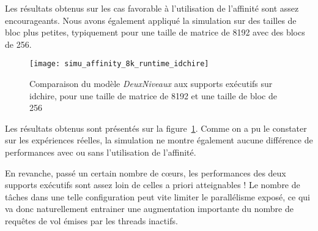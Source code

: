 Les résultats obtenus sur les cas favorable à l'utilisation de l'affinité sont assez encourageants.
Nous avons également appliqué la simulation sur des tailles de bloc plus petites, typiquement pour une taille de matrice de 8192 avec des blocs de 256.

\begin{figure}[h!]
  \centering
  \texttt{[image: simu\_affinity\_8k\_runtime\_idchire]}
  \caption{Comparaison du modèle \emph{DeuxNiveaux} aux supports exécutifs sur idchire, pour une taille de matrice de 8192 et une taille de bloc de 256}\label{fig:simu:affinityavg-8k-vs-runtime:idchire}
\end{figure}






Les résultats obtenus sont présentés sur la figure~\ref{fig:simu:affinityavg-8k-vs-runtime:idchire}.
Comme on a pu le constater sur les expériences réelles, la simulation ne montre également aucune différence de performances avec ou sans l'utilisation de l'affinité.

En revanche, passé un certain nombre de cœurs, les performances des deux supports exécutifs sont assez loin de celles a priori atteignables !
Le nombre de tâches dans une telle configuration peut vite limiter le parallélisme exposé, ce qui va donc naturellement entrainer une augmentation importante du nombre de requêtes de vol émises par les threads inactifs.

